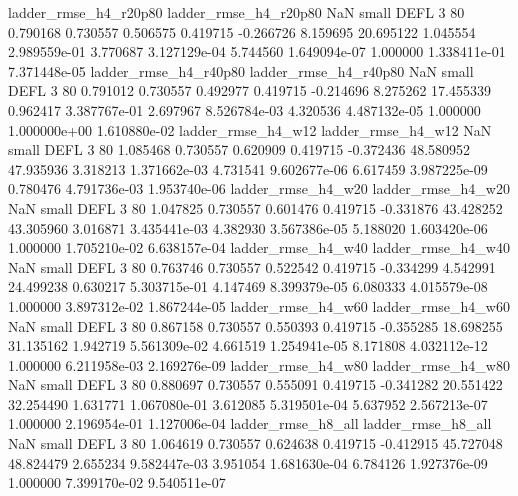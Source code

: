    ladder_rmse_h4_r20p80    ladder_rmse_h4_r20p80                   NaN      small     DEFL                 3 80 0.790168       0.730557 0.506575       0.419715   -0.266726      8.159695     20.695122     1.045554   2.989559e-01  3.770687 3.127129e-04     5.744560   1.649094e-07            1.000000    1.338411e-01        7.371448e-05
   ladder_rmse_h4_r40p80    ladder_rmse_h4_r40p80                   NaN      small     DEFL                 3 80 0.791012       0.730557 0.492977       0.419715   -0.214696      8.275262     17.455339     0.962417   3.387767e-01  2.697967 8.526784e-03     4.320536   4.487132e-05            1.000000    1.000000e+00        1.610880e-02
      ladder_rmse_h4_w12       ladder_rmse_h4_w12                   NaN      small     DEFL                 3 80 1.085468       0.730557 0.620909       0.419715   -0.372436     48.580952     47.935936     3.318213   1.371662e-03  4.731541 9.602677e-06     6.617459   3.987225e-09            0.780476    4.791736e-03        1.953740e-06
      ladder_rmse_h4_w20       ladder_rmse_h4_w20                   NaN      small     DEFL                 3 80 1.047825       0.730557 0.601476       0.419715   -0.331876     43.428252     43.305960     3.016871   3.435441e-03  4.382930 3.567386e-05     5.188020   1.603420e-06            1.000000    1.705210e-02        6.638157e-04
      ladder_rmse_h4_w40       ladder_rmse_h4_w40                   NaN      small     DEFL                 3 80 0.763746       0.730557 0.522542       0.419715   -0.334299      4.542991     24.499238     0.630217   5.303715e-01  4.147469 8.399379e-05     6.080333   4.015579e-08            1.000000    3.897312e-02        1.867244e-05
      ladder_rmse_h4_w60       ladder_rmse_h4_w60                   NaN      small     DEFL                 3 80 0.867158       0.730557 0.550393       0.419715   -0.355285     18.698255     31.135162     1.942719   5.561309e-02  4.661519 1.254941e-05     8.171808   4.032112e-12            1.000000    6.211958e-03        2.169276e-09
      ladder_rmse_h4_w80       ladder_rmse_h4_w80                   NaN      small     DEFL                 3 80 0.880697       0.730557 0.555091       0.419715   -0.341282     20.551422     32.254490     1.631771   1.067080e-01  3.612085 5.319501e-04     5.637952   2.567213e-07            1.000000    2.196954e-01        1.127006e-04
      ladder_rmse_h8_all       ladder_rmse_h8_all                   NaN      small     DEFL                 3 80 1.064619       0.730557 0.624638       0.419715   -0.412915     45.727048     48.824479     2.655234   9.582447e-03  3.951054 1.681630e-04     6.784126   1.927376e-09            1.000000    7.399170e-02        9.540511e-07
